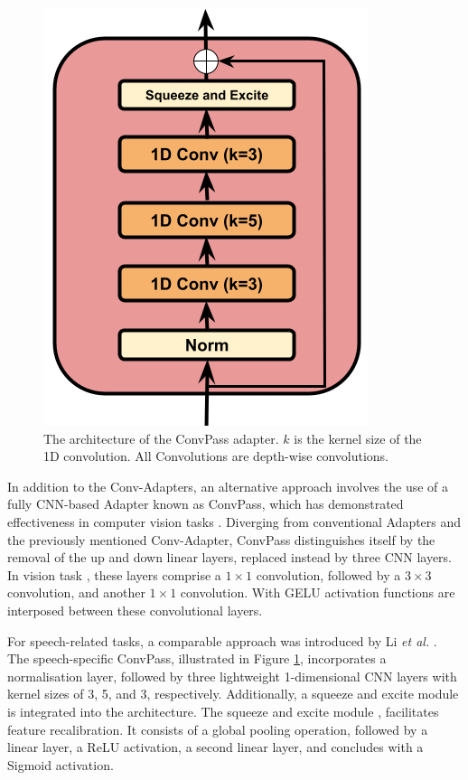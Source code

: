 \begin{figure}[h]
    \begin{center}
        \includegraphics[scale=0.4]{imgs/ConvPass.png}
        \caption{The architecture of the ConvPass adapter. $k$ is the kernel size of the 1D convolution. All Convolutions are depth-wise convolutions.}
        \label{fig:convpass}
    \end{center}
\end{figure}

In addition to the Conv-Adapters, an alternative approach involves the use of a fully \ac{CNN}-based Adapter known as ConvPass, which has demonstrated effectiveness in computer vision tasks \cite{jie2022convolutional}. Diverging from conventional Adapters and the previously mentioned Conv-Adapter, ConvPass distinguishes itself by the removal of the up and down linear layers, replaced instead by three \ac{CNN} layers. In vision task \cite{jie2022convolutional}, these layers comprise a $1 \times 1$ convolution, followed by a $3 \times 3$ convolution, and another $1 \times 1$ convolution. With \ac{GELU} activation functions are interposed between these convolutional layers.

For speech-related tasks, a comparable approach was introduced by Li \textit{et al.} \cite{li2023evaluating}. The speech-specific ConvPass, illustrated in Figure \ref{fig:convpass}, incorporates a normalisation layer, followed by three lightweight 1-dimensional \ac{CNN} layers with kernel sizes of 3, 5, and 3, respectively. Additionally, a squeeze and excite module is integrated into the architecture. The squeeze and excite module \cite{hu2018squeeze}, facilitates feature recalibration. It consists of a global pooling operation, followed by a linear layer, a \ac{ReLU} activation, a second linear layer, and concludes with a Sigmoid activation.

